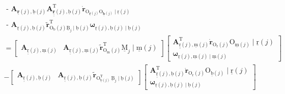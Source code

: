 \[\begin{array}{l}
\text { - } \boldsymbol{A}_{\underline{\mathbf{r}}(j), \underline{\mathrm{b}}(j)} \boldsymbol{A}_{\underline{\underline{\mathbf{r}}}(j), \underline{\mathrm{b}}(j)}^{\mathrm{T}} \dot{\boldsymbol{r}}_{\mathrm{O}_{\underline{\mathbf{r}}(j)} \mathrm{O}_{\underline{\underline{\mathbf{b}}}(j)} \mid \underline{\mathrm{r}}(j)} \\
\text { - } \boldsymbol{A}_{\underline{\mathrm{r}}(j), \underline{\mathrm{b}}(j)} \tilde{\boldsymbol{r}}_{\mathrm{O}_{\mathrm{b}}(j) \underline{\mathrm{B}}_{j} \mid \underline{\mathrm{b}}(j)}^{\mathrm{T}} \boldsymbol{\omega}_{\underline{\mathrm{r}}(j), \underline{\mathrm{b}}(j) \mid \underline{\mathrm{b}}(j)} \\
=\left[\begin{array}{ll}
\boldsymbol{A}_{\underline{\underline{\mathrm{r}}}(j), \underline{\mathrm{m}}(j)} & \boldsymbol{A}_{\underline{\underline{\mathrm{r}}}(j), \underline{\mathrm{m}}(j)} \tilde{\boldsymbol{r}}_{\mathrm{O}_{\mathrm{m}}(j)}^{\mathrm{T}} \underline{\mathrm{M}}_{j} \mid \underline{\mathrm{m}}(j)
\end{array}\right]\left[\begin{array}{c}
\boldsymbol{A}_{\underline{\underline{\mathrm{r}}}(j), \underline{\mathrm{m}}(j)}^{\mathrm{T}} \dot{\boldsymbol{r}}_{\mathrm{O}_{\mathrm{r}}(j)} \mathrm{O}_{\underline{\mathrm{m}}(j)} \mid \underline{\mathrm{r}}(j) \\
\boldsymbol{\omega}_{\underline{\mathrm{r}}(j), \underline{\mathrm{m}}(j) \mid \underline{\mathrm{m}}(j)}
\end{array}\right] \\
-\left[\begin{array}{ll}
\boldsymbol{A}_{\underline{\underline{\mathrm{r}}}(j), \underline{\mathrm{b}}(j)} & \boldsymbol{A}_{\underline{\underline{\mathrm{r}}}(j), \underline{\mathrm{b}}(j)} \tilde{\boldsymbol{r}}_{\mathrm{O}_{\underline{\mathrm{b}}(j)}^{\mathrm{T}} \underline{\mathrm{~B}}_{j} \mid \underline{\mathrm{b}}(j)}
\end{array}\right]\left[\begin{array}{c}
\boldsymbol{A}_{\underline{\underline{\mathrm{r}}}(j), \underline{\mathrm{b}}(j)}^{\mathrm{T}} \dot{\boldsymbol{r}}_{\mathrm{O}_{\mathrm{r}}(j)} \mathrm{O}_{\underline{\mathrm{b}}(j)} \mid \underline{\mathrm{r}}(j) \\
\boldsymbol{\omega}_{\underline{\mathrm{r}}(j), \underline{\mathrm{b}}(j) \mid \underline{\mathrm{b}}(j)}
\end{array}\right] \\

\end{array}\]
